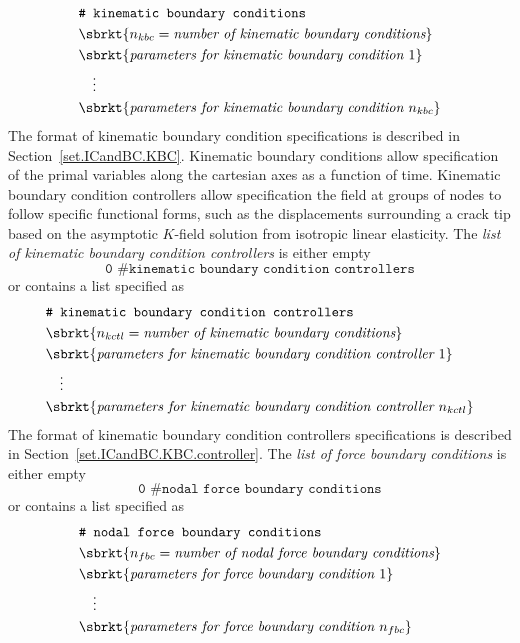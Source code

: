 \begin{align}
& \texttt{\# kinematic boundary conditions} \notag \\
& \sbrkt{n_{kbc} = \textit{number of kinematic boundary conditions}} \notag \\
& \sbrkt{\textit{parameters for kinematic boundary condition~} 1} \notag \\
& \quad \vdots \notag \\
& \sbrkt{\textit{parameters for kinematic boundary condition~} n_{kbc}} \notag
\end{align}
The format of kinematic boundary condition specifications is described in
Section~\ref{set.ICandBC.KBC}.
Kinematic boundary conditions allow specification of the primal 
variables along the cartesian axes as a function of time.
Kinematic boundary condition controllers allow specification the field at 
groups of nodes to follow specific functional forms, such as the 
displacements surrounding a crack tip based on the asymptotic $K$-field 
solution from isotropic linear elasticity.
The \textit{list of kinematic boundary condition controllers}
is either empty
\[ \texttt{0 \# kinematic boundary condition controllers}\]	
or contains a list specified as
\begin{align}
& \texttt{\# kinematic boundary condition controllers} \notag \\
& \sbrkt{n_{kctl} = \textit{number of kinematic boundary conditions}} \notag \\
& \sbrkt{\textit{parameters for kinematic boundary condition controller~} 1} \notag \\
& \quad \vdots \notag \\
& \sbrkt{\textit{parameters for kinematic boundary condition controller~} n_{kctl}} \notag
\end{align}
The format of kinematic boundary condition controllers specifications is described in
Section~\ref{set.ICandBC.KBC.controller}.
The \textit{list of force boundary conditions} is either empty
\[ \texttt{0 \# nodal force boundary conditions}\]	
or contains a list specified as
\begin{align}
& \texttt{\# nodal force boundary conditions} \notag \\
& \sbrkt{n_{fbc} = \textit{number of nodal force boundary conditions}} \notag \\
& \sbrkt{\textit{parameters for force boundary condition~} 1} \notag \\
& \quad \vdots \notag \\
& \sbrkt{\textit{parameters for force boundary condition~} n_{fbc}} \notag
\end{align}

